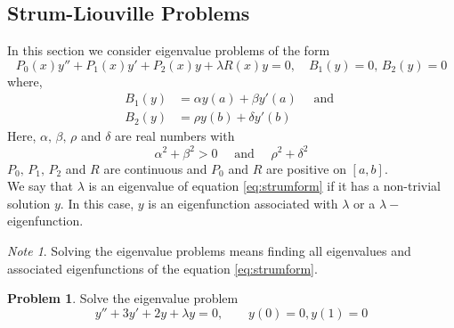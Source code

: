 \documentclass[12pt,a4paper]{article}
\theoremstyle{remark}
\newtheorem* {note}{Note}
\theoremstyle{definition}
\newtheorem{prob}{Problem}[section]
\begin{document}
\subsection{Strum-Liouville Problems}
In this section we consider eigenvalue problems of the form
\begin{equation}
    \label{eq:strumform}
    P_0(x)y''+P_1(x)y'+P_2(x)y+\lambda R(x)y=0,\quad B_1(y)=0,\,B_2(y)=0
\end{equation}
where,
\begin{align*}
    B_1(y) & =\alpha y(a)+\beta y'(a) \quad \text{ and } \\
    B_2(y) & =\rho y(b)+\delta y'(b)
\end{align*}
Here, $ \alpha,\,\beta,\,\rho $ and $ \delta $ are real numbers with
\[
    \alpha^2+\beta^2>0\quad\text{ and }\quad \rho^2+\delta^2
\]
$ P_0,\,P_1,\,P_2 $ and $ R $ are continuous and $ P_0 $ and $ R $ are positive on $ [a,b] $.\\
We say that $ \lambda $ is an eigenvalue of equation \eqref{eq:strumform} if it has a non-trivial solution $ y $. In this case, $ y $ is an eigenfunction associated with $ \lambda $ or a $ \lambda- $eigenfunction.
\begin{note}
    Solving the eigenvalue problems means finding all eigenvalues and associated eigenfunctions of the equation \eqref{eq:strumform}.
\end{note}
\begin{prob}
    Solve the eigenvalue problem
    \[
        y''+3y'+2y+\lambda y=0,\qquad y(0)=0,y(1)=0
    \]
\end{prob}
\end{document}
